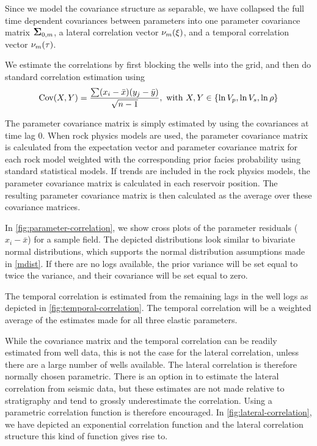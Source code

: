 Since we model the covariance structure as separable, we have
collapsed the full time dependent covariances between parameters into
one parameter covariance matrix $\mbox{\large\ensuremath{\boldsymbol{\Sigma}}}_{0,m}$, a lateral correlation
vector $\nu_m(\xi)$, and a temporal correlation vector
$\nu_m(\tau)$.

We estimate the correlations by first blocking the wells into the
grid, and then do standard correlation estimation using
\begin{equation}
\text{Cov}(X,Y) = \frac{\sum(x_i - \bar{x})(y_j - \bar{y})}{\sqrt{n - 1}},\
  \text{with}\ X,Y\in\{\ln V_p, \ln V_s, \ln\rho\}
\end{equation}

The parameter covariance matrix is simply estimated by using the
covariances at time lag 0. When rock physics models are used, the parameter covariance matrix is calculated from the expectation vector and parameter covariance matrix for each rock model weighted with the corresponding prior facies probability using standard statistical models. If trends are included in the rock physics models, the parameter covariance matrix is calculated in each reservoir position. The resulting parameter covariance matrix is then calculated as the average over these covariance matrices. 

In \autoref{fig:parameter-correlation}, we
show cross plots of the parameter residuals ($x_i - \bar{x}$) for a
sample field. The depicted distributions look similar to bivariate
normal distributions, which supports the normal distribution
assumptions made in \autoref{mdist}. If there are no \vs logs
available, the prior \vs variance will be set equal to twice the \vp
variance, and their covariance will be set equal to zero.

The temporal correlation is estimated from the remaining lags in the
well logs as depicted in \autoref{fig:temporal-correlation}. The
temporal correlation will be a weighted average of the estimates made
for all three elastic parameters.

While the covariance matrix and the temporal correlation can be readily
estimated from well data, this is not the case for the lateral
correlation, unless there are a large number of wells available. The
lateral correlation is therefore normally chosen parametric. There is
an option in \crava to estimate the lateral correlation from seismic
data, but these estimates are not made relative to stratigraphy and
tend to grossly underestimate the correlation. Using a parametric
correlation function is therefore encouraged. In
\autoref{fig:lateral-correlation}, we have depicted an exponential
correlation function and the lateral correlation structure this kind
of function gives rise to.


